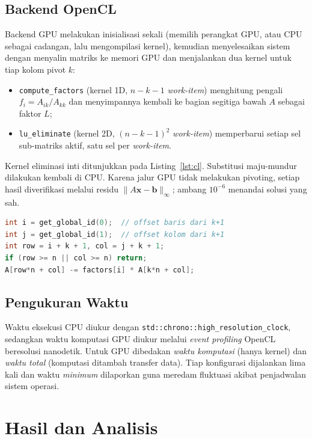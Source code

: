 \documentclass[conference]{IEEEtran}
\begin{document}
\subsection{Backend OpenCL}
Backend GPU melakukan inisialisasi sekali (memilih perangkat GPU, atau CPU sebagai cadangan, lalu mengompilasi kernel), kemudian menyelesaikan sistem dengan menyalin matriks ke memori GPU dan menjalankan dua kernel untuk tiap kolom pivot $k$:
\begin{itemize}
\item \texttt{compute\_factors} (kernel 1D, $n-k-1$ \emph{work-item}) menghitung pengali $f_i=A_{ik}/A_{kk}$ dan menyimpannya kembali ke bagian segitiga bawah $A$ sebagai faktor $L$;
\item \texttt{lu\_eliminate} (kernel 2D, $(n-k-1)^2$ \emph{work-item}) memperbarui setiap sel sub-matriks aktif, satu sel per \emph{work-item}.
\end{itemize}
Kernel eliminasi inti ditunjukkan pada Listing~\ref{lst:cl}. Substitusi maju-mundur dilakukan kembali di CPU. Karena jalur GPU tidak melakukan pivoting, setiap hasil diverifikasi melalui residu $\lVert A\mathbf{x}-\mathbf{b}\rVert_\infty$; ambang $10^{-6}$ menandai solusi yang sah.

\begin{lstlisting}[language=C,caption={Kernel eliminasi GPU (\texttt{lu\_eliminate.cl}).},label={lst:cl}]
int i = get_global_id(0);  // offset baris dari k+1
int j = get_global_id(1);  // offset kolom dari k+1
int row = i + k + 1, col = j + k + 1;
if (row >= n || col >= n) return;
A[row*n + col] -= factors[i] * A[k*n + col];
\end{lstlisting}

\subsection{Pengukuran Waktu}
Waktu eksekusi CPU diukur dengan \texttt{std::chrono::high\_resolution\_clock}, sedangkan waktu komputasi GPU diukur melalui \emph{event profiling} OpenCL beresolusi nanodetik. Untuk GPU dibedakan \emph{waktu komputasi} (hanya kernel) dan \emph{waktu total} (komputasi ditambah transfer data). Tiap konfigurasi dijalankan lima kali dan waktu \emph{minimum} dilaporkan guna meredam fluktuasi akibat penjadwalan sistem operasi.

\section{Hasil dan Analisis}
\end{document}
